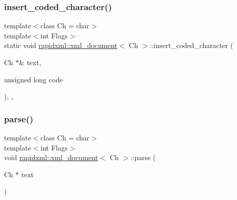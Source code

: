 \subsubsection{\texorpdfstring{insert\_coded\_character()}{insert\_coded\_character()}}
{\footnotesize\ttfamily template$<$class Ch = char$>$ \\
template$<$int Flags$>$ \\
static void \mbox{\hyperlink{classrapidxml_1_1xml__document}{rapidxml\+::xml\+\_\+document}}$<$ Ch $>$\+::insert\+\_\+coded\+\_\+character (\begin{DoxyParamCaption}\item[{Ch $\ast$\&}]{text,  }\item[{unsigned long}]{code }\end{DoxyParamCaption})\hspace{0.3cm}{\ttfamily [inline]}, {\ttfamily [static]}, {\ttfamily [private]}}

\mbox{\label{classrapidxml_1_1xml__document_ac6e73ff9ac323bf5a370c38feb03a6b1}} 
\subsubsection{\texorpdfstring{parse()}{parse()}}
{\footnotesize\ttfamily template$<$class Ch = char$>$ \\
template$<$int Flags$>$ \\
void \mbox{\hyperlink{classrapidxml_1_1xml__document}{rapidxml\+::xml\+\_\+document}}$<$ Ch $>$\+::parse (\begin{DoxyParamCaption}\item[{Ch $\ast$}]{text }\end{DoxyParamCaption})\hspace{0.3cm}{\ttfamily [inline]}}

